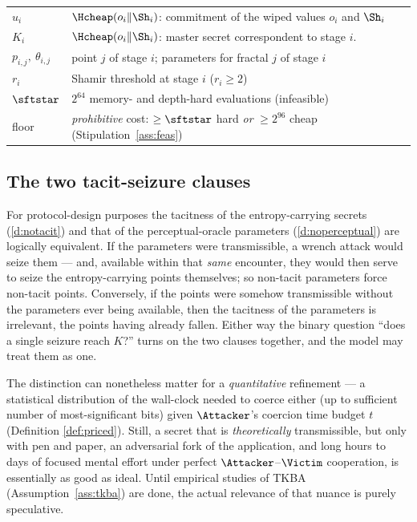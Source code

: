 \begin{tabularx}{\linewidth}{@{}l X@{}}
$u_i$ & $\Hcheap(o_{i}\|\Sh_{i})$: commitment of the wiped values $o_{i}$ and $\Sh_{i}$ \\
$K_i$ & $\Hcheap(o_{i}\|\Sh_{i})$: master secret correspondent to stage $i$. \\
$p_{i,j},\ \theta_{i,j}$ & point $j$ of stage $i$; parameters for fractal $j$ of stage $i$ \\
$r_i$ & Shamir threshold at stage $i$ ($r_i \ge 2$) \\
$\sftstar$ & $2^{64}$ memory- and depth-hard evaluations (infeasible) \\
floor & \emph{prohibitive} cost: $\ge \sftstar$ hard \emph{or} $\ge 2^{96}$ cheap (Stipulation~\ref{ass:feas}) \\
\bottomrule
\end{tabularx}
\endgroup

\subsection{The two tacit-seizure clauses}
\label{app:notation-tacit}

\begin{remark}\label{rem:tacit-coincide}
For protocol-design purposes the tacitness of the entropy-carrying secrets
(\ref{d:notacit}) and that of the perceptual-oracle parameters
(\ref{d:noperceptual}) are logically equivalent. If the parameters were
transmissible, a wrench attack would seize them --- and, available within that
\emph{same} encounter, they would then serve to seize the entropy-carrying points
themselves; so non-tacit parameters force non-tacit points. Conversely, if the
points were somehow transmissible without the parameters ever being available,
then the tacitness of the parameters is irrelevant, the points having already
fallen. Either way the binary question ``does a single seizure reach $K$?'' turns
on the two clauses together, and the model may treat them as one.
\end{remark}

\begin{remark}\label{rem:tacit-quantitative}
The distinction can nonetheless matter for a \emph{quantitative} refinement --- a
statistical distribution of the wall-clock needed to coerce either (up to sufficient
number of most-significant bits) given $\Attacker$'s coercion time budget $t$ 
(Definition \ref{def:priced}). Still, a secret that is \emph{theoretically} transmissible, 
but only with pen and paper, an adversarial fork of the application, and long hours 
to days of focused mental effort under perfect $\Attacker$--$\Victim$ cooperation, 
is essentially as good as ideal. Until empirical studies of TKBA (Assumption~\ref{ass:tkba}) 
are done, the actual relevance of that nuance is purely speculative.
\end{remark}


